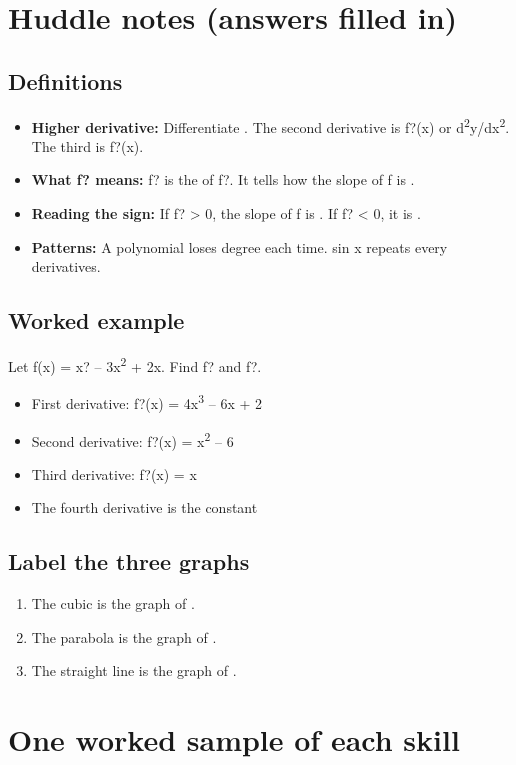 \documentclass[11pt]{article}
\begin{document}
\section*{Huddle notes (answers filled in)}
\subsection*{Definitions}\begin{itemize}
\item \textbf{Higher derivative:} Differentiate . The second derivative is f?(x) or d\textsuperscript{2}y/dx\textsuperscript{2}. The third is f?(x).
\item \textbf{What f? means:} f? is the  of f?. It tells how the slope of f is .
\item \textbf{Reading the sign:} If f? > 0, the slope of f is . If f? < 0, it is .
\item \textbf{Patterns:} A polynomial loses  degree each time. sin x repeats every  derivatives.
\end{itemize}
\subsection*{Worked example}
Let f(x) = x? -- 3x\textsuperscript{2} + 2x. Find f? and f?.\\
\begin{itemize}
\item First derivative: f?(x) = 4x\textsuperscript{3} -- 6x + 2
\item Second derivative: f?(x) = x\textsuperscript{2} -- 6
\item Third derivative: f?(x) = x
\item The fourth derivative is the constant 
\end{itemize}
\subsection*{Label the three graphs}
\begin{enumerate}
\item The cubic is the graph of .
\item The parabola is the graph of .
\item The straight line is the graph of .
\end{enumerate}
\section*{One worked sample of each skill}
\end{document}
